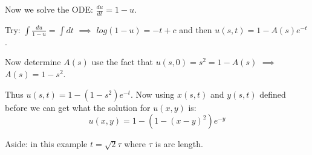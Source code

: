 Now we solve the ODE: $\displaystyle \frac{du}{dt} = 1 -u$.

Try: $\int \frac{du}{1-u} = \int dt$ $\implies$ $log (1-u) = -t + c$ and then $u(s,t) = 1 - A(s) e^{-t}$.

Now determine $A(s)$ use the fact that $u(s,0) = s^2 = 1 - A(s)$ $\implies$ $A(s) = 1 - s^2$.

Thus $u(s,t) = 1 - (1-s^2)e^{-t}$. Now using $x(s,t)$ and $y(s,t)$ defined before we can get what the solution for $u(x,y)$ is: $$u(x,y) = 1 - (1-(x-y)^2) e^{-y}$$

Aside: in this example $t = \sqrt{2} \tau$ where $\tau$ is arc length.